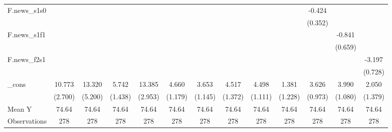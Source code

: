 {\begin{tabular}{l*{12}{c}}
\addlinespace
F.news\_s1s0 &                     &                     &                     &                     &                     &                     &                     &                     &                     &      -0.424         &                     &                     \\
            &                     &                     &                     &                     &                     &                     &                     &                     &                     &     (0.352)         &                     &                     \\
\addlinespace
F.news\_s1f1 &                     &                     &                     &                     &                     &                     &                     &                     &                     &                     &      -0.841         &                     \\
            &                     &                     &                     &                     &                     &                     &                     &                     &                     &                     &     (0.659)         &                     \\
\addlinespace
F.news\_f2s1 &                     &                     &                     &                     &                     &                     &                     &                     &                     &                     &                     &      -3.197\sym{***}\\
            &                     &                     &                     &                     &                     &                     &                     &                     &                     &                     &                     &     (0.728)         \\
\addlinespace
\_cons      &      10.773\sym{***}&      13.320\sym{**} &       5.742\sym{***}&      13.385\sym{***}&       4.660\sym{***}&       3.653\sym{***}&       4.517\sym{***}&       4.498\sym{***}&       1.381         &       3.626\sym{***}&       3.990\sym{***}&       2.050         \\
            &     (2.700)         &     (5.200)         &     (1.438)         &     (2.953)         &     (1.179)         &     (1.145)         &     (1.372)         &     (1.111)         &     (1.228)         &     (0.973)         &     (1.080)         &     (1.379)         \\
\midrule
Mean Y      &       74.64         &       74.64         &       74.64         &       74.64         &       74.64         &       74.64         &       74.64         &       74.64         &       74.64         &       74.64         &       74.64         &       74.64         \\
Observations&         278         &         278         &         278         &         278         &         278         &         278         &         278         &         278         &         278         &         278         &         278         &         278         \\
\bottomrule
\end{tabular}
}

